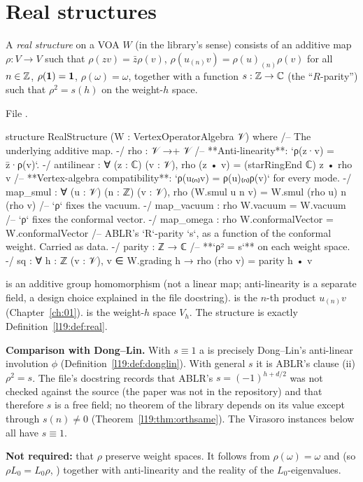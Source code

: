 \section{Real structures}\label{l19:sec:real}

\begin{definition}\label{l19:def:real}
A \emph{real structure} on a VOA $W$ (in the library's sense) consists of an additive map
$\rho:V\to V$ such that $\rho(zv) = \bar z\rho(v)$, $\rho(u_{(n)}v) = \rho(u)_{(n)}\rho(v)$ for all
$n\in{\mathbb{Z}}$, $\rho(\mathbf{1}) = \mathbf{1}$, $\rho(\omega) = \omega$, together with a function
$s:{\mathbb{Z}}\to{\mathbb{C}}$ (the ``$R$-parity'') such that $\rho^2 = s(h)$ on the weight-$h$ space.
\end{definition}

\noindent File .
\begin{leancode}
structure RealStructure (W : VertexOperatorAlgebra 𝒱) where
  /-- The underlying additive map. -/
  rho : 𝒱 →+ 𝒱
  /-- **Anti-linearity**: `ρ(z·v) = z̄·ρ(v)`. -/
  antilinear : ∀ (z : ℂ) (v : 𝒱), rho (z • v) = (starRingEnd ℂ) z • rho v
  /-- **Vertex-algebra compatibility**: `ρ(u₍ₙ₎v) = ρ(u)₍ₙ₎ρ(v)` for every mode. -/
  map_smul : ∀ (u : 𝒱) (n : ℤ) (v : 𝒱), rho (W.smul u n v) = W.smul (rho u) n (rho v)
  /-- `ρ` fixes the vacuum. -/
  map_vacuum : rho W.vacuum = W.vacuum
  /-- `ρ` fixes the conformal vector. -/
  map_omega : rho W.conformalVector = W.conformalVector
  /-- ABLR's `R`-parity `s`, as a function of the conformal weight.  Carried as data. -/
  parity : ℤ → ℂ
  /-- **`ρ² = s`** on each weight space. -/
  sq : ∀ {h : ℤ} (v : 𝒱), v ∈ W.grading h → rho (rho v) = parity h • v
\end{leancode}

\begin{dictionary}
 is an additive group homomorphism (not a linear map; anti-linearity is a separate
field, a design choice explained in the file docstring).  is the $n$-th product
$u_{(n)}v$ (Chapter~\ref{ch:01}).  is the weight-$h$ space $V_h$. The structure is
exactly Definition~\ref{l19:def:real}.

\textbf{Comparison with Dong--Lin.} With $s\equiv1$ a  is precisely Dong--Lin's
anti-linear involution $\phi$ (Definition~\ref{l19:def:donglin}). With general $s$ it is ABLR's
clause (ii) $\rho^2 = s$. The file's docstring records that ABLR's $s = (-1)^{h+d/2}$ was not checked
against the source (the paper was not in the repository) and that therefore $s$ is a free field; no
theorem of the library depends on its value except through $s(n)\ne0$
(Theorem~\ref{l19:thm:orthsame}). The Virasoro instances below all have $s\equiv1$.

\textbf{Not required:} that $\rho$ preserve weight spaces. It follows from $\rho(\omega)=\omega$
and  (so $\rho L_0 = L_0\rho$, ) together with
anti-linearity and the reality of the $L_0$-eigenvalues.
\end{dictionary}

